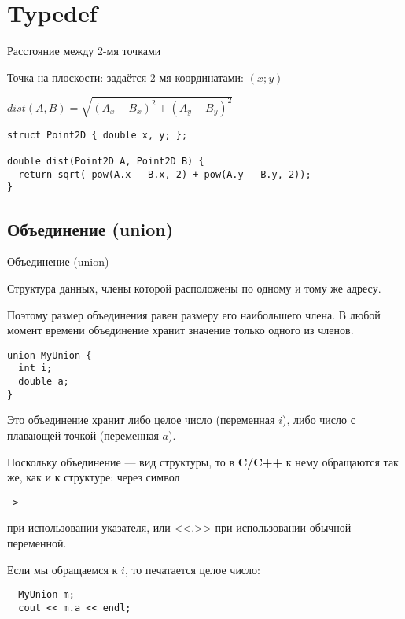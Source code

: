 \section{Typedef}

\begin{frame}[t,fragile]{Расстояние между 2-мя точками}

Точка на плоскости: задаётся 2-мя координатами: $(x; y)$

$dist(A, B) = \sqrt{{(A_x - B_x)^2} + {(A_y - B_y)^2}}$

\begin{lstlisting}
struct Point2D { double x, y; };

double dist(Point2D A, Point2D B) {
  return sqrt( pow(A.x - B.x, 2) + pow(A.y - B.y, 2));
}
\end{lstlisting}
\end{frame}

\subsection{Объединение (union)}

\begin{frame}[t,fragile]{Объединение (union)}

Структура данных, 
члены которой расположены по одному и тому же адресу.
 
Поэтому размер объединения равен размеру его наибольшего члена. 
В любой момент времени объединение хранит значение только одного из членов.

\begin{lstlisting}
union MyUnion {
  int i;
  double a;
}
\end{lstlisting}

Это объединение хранит либо целое число (переменная $i$), 
либо число с плавающей точкой (переменная $a$). 

Поскольку объединение --- вид структуры, то в 
\textbf{C/C++} к нему обращаются так же, 
как и к структуре: через символ 
\begin{lstlisting}
-> 
\end{lstlisting}
при использовании указателя, 
или <<.>> при использовании обычной переменной. 

Если мы обращаемся к $i$, то печатается целое число:

\begin{lstlisting}
  MyUnion m;
  cout << m.a << endl;
\end{lstlisting}
\end{frame}

